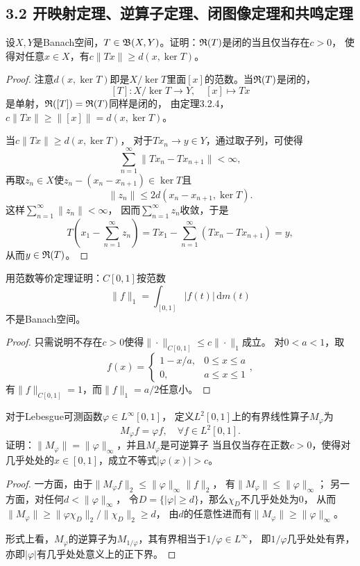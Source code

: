 \subsection{3.2 开映射定理、逆算子定理、闭图像定理和共鸣定理}
\begin{1}
    设$X,Y$是Banach空间，$T\in\mathfrak{B}(X,Y)$。证明：$\mathfrak{R}(T)$是闭的当且仅当存在$c>0$，
    使得对任意$x\in X$，有$c\|Tx\|\geqslant d(x,\ker T)$。
\end{1}
\begin{proof}
    注意$d(x,\ker T)$即是$X/\ker T$里面$[x]$的范数。当$\mathfrak{R}(T)$是闭的，
    \[[T]\colon X/\ker T \to Y,\quad[x] \mapsto Tx\]
    是单射，$\mathfrak{R}([T])=\mathfrak{R}(T)$同样是闭的，
    由定理3.2.4，$c\|Tx\|\geqslant\|[x]\|=d(x,\ker T)$。

    当$c\|Tx\|\geqslant d(x,\ker T)$，
    对于$Tx_n \to y \in Y$，通过取子列，可使得
    \[\sum_{n=1}^\infty\|Tx_n-Tx_{n+1}\|<\infty,\]
    再取$z_n\in X$使$z_n-(x_n-x_{n+1})\in\ker T$且
    \[\|z_n\|\leqslant2d(x_n-x_{n+1},\ker T).\]
    这样$\sum\limits_{n=1}^\infty\|z_n\|<\infty$，
    因而$\sum\limits_{n=1}^\infty z_n$收敛，于是
    \[T\left(x_1-\sum_{n=1}^\infty z_n\right)
    =Tx_1-\sum_{n=1}^\infty(Tx_n-Tx_{n+1})=y,\]
    从而$y\in\mathfrak{R}(T)$。
\end{proof}

\begin{2}
    用范数等价定理证明：$C[0,1]$按范数
    \[\|f\|_1=\int_{[0,1]}|f(t)|\,\mathrm{d}m(t)\]
    不是Banach空间。
\end{2}
\begin{proof}
    只需说明不存在$c>0$使得$\|\cdot\|_{C[0,1]} \leqslant c\|\cdot\|_1$成立。
    对$0<a<1$，取\[f(x)=\begin{cases}1-x/a,&0 \leqslant x \leqslant a\\
    0,&a \leqslant x \leqslant 1\end{cases},\]
    有$\|f\|_{C[0,1]}=1$，而$\|f\|_1=a/2$任意小。
\end{proof}

\begin{3}
    对于Lebesgue可测函数$\varphi \in L^\infty[0,1]$，
    定义$L^2[0,1]$上的有界线性算子$M_\varphi$为
    \[M_\varphi f=\varphi f,\quad\forall f \in L^2[0,1].\]
    证明：$\|M_\varphi\|=\|\varphi\|_\infty$，并且$M_\varphi$是可逆算子
    当且仅当存在正数$c>0$，使得对几乎处处的$x\in[0,1]$，成立不等式$|\varphi(x)|>c$。
\end{3}
\begin{proof}
    一方面，由于$\|M_\varphi f\|_2\leqslant\|\varphi\|_\infty\|f\|_2$，
    有$\|M_\varphi\|\leqslant\|\varphi\|_\infty$；
    另一方面，对任何$d<\|\varphi\|_\infty$，
    令$D=\{|\varphi| \geqslant d\}$，那么$\chi_D$不几乎处处为$0$，
    从而$\|M_\varphi\|\geqslant\|\varphi\chi_D\|_2/\|\chi_D\|_2 \geqslant d$，
    由$d$的任意性进而有$\|M_\varphi\|\geqslant\|\varphi\|_\infty$。

    形式上看，$M_\varphi$的逆算子为$M_{1/\varphi}$，其有界相当于$1/\varphi \in L^\infty$，
    即$1/\varphi$几乎处处有界，亦即$|\varphi|$有几乎处处意义上的正下界。
\end{proof}

